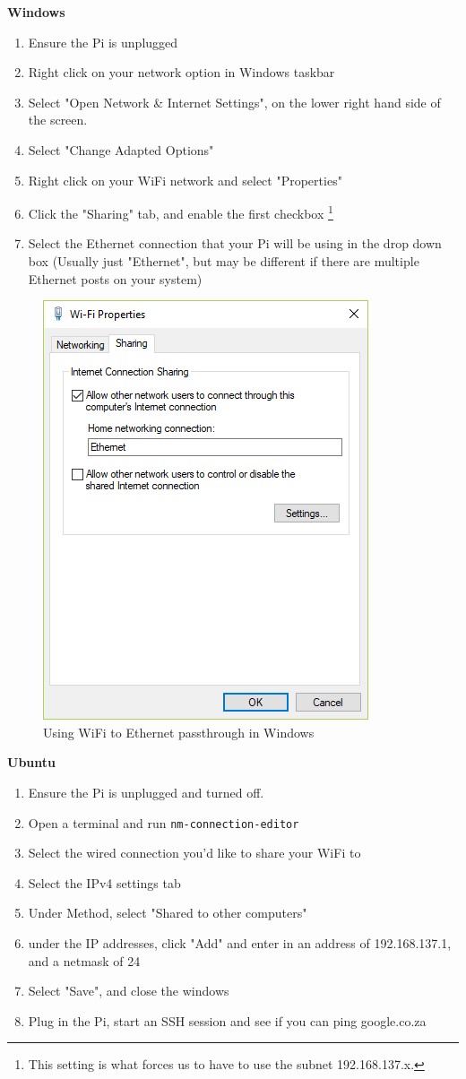 \textbf{Windows}\\
\begin{enumerate}
    \item Ensure the Pi is unplugged
    \item Right click on your network option in Windows taskbar
    \item Select  "Open Network \& Internet Settings", on the lower right hand side of the screen.
    \item Select "Change Adapted Options"
    \item Right click on your WiFi network and select "Properties"
    \item Click the "Sharing" tab, and enable the first checkbox \footnote{This setting is what forces us to have to use the subnet 192.168.137.x.}
    \item Select the Ethernet connection that your Pi will be using in the drop down box (Usually just "Ethernet", but may be different if there are multiple Ethernet posts on your system)
\end{enumerate}

\begin{figure}[H]
\centering
\includegraphics[width=0.5\columnwidth]{Figures/windowspassthrough}
\caption{Using WiFi to Ethernet passthrough in Windows}
\label{fig:windowspassthrough}
\end{figure}

\textbf{Ubuntu}\\
\begin{enumerate}
    \item Ensure the Pi is unplugged and turned off.
    \item Open a terminal and run \verb|nm-connection-editor|
    \item Select the wired connection you'd like to share your WiFi to
    \item Select the IPv4 settings tab
    \item Under Method, select "Shared to other computers"
    \item under the IP addresses, click "Add" and enter in an address of 192.168.137.1, and a netmask of 24
    \item Select "Save", and close the windows
    \item Plug in the Pi, start an SSH session and see if you can ping google.co.za
\end{enumerate}

